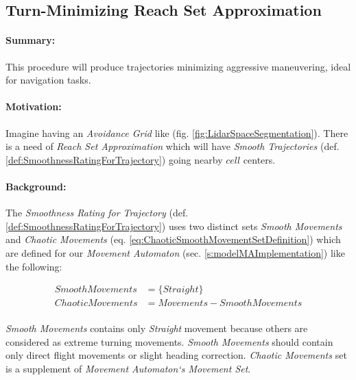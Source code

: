 \newpage
\subsection{Turn-Minimizing Reach Set Approximation}\label{s:harmonicReachSet}

\paragraph{Summary:} This procedure will produce trajectories minimizing aggressive maneuvering, ideal for navigation tasks.

\paragraph{Motivation:} Imagine having an \emph{Avoidance Grid} like (fig. \ref{fig:LidarSpaceSegmentation}). There is a need of \emph{Reach Set Approximation} which will have \emph{Smooth Trajectories} (def. \ref{def:SmoothnessRatingForTrajectory}) going nearby $cell$ centers.

\paragraph{Background:} The \emph{Smoothness Rating for Trajectory} (def. \ref{def:SmoothnessRatingForTrajectory}) uses two distinct sets \emph{Smooth Movements} and \emph{Chaotic Movements} (eq. \ref{eq:ChaoticSmoothMovementSetDefinition}) which are defined for our \emph{Movement Automaton}  (sec. \ref{s:modelMAImplementation}) like the following:

\begin{equation}
    \begin{aligned}
    Smooth Movements &= \{Straight\} \\
    Chaotic Movements &= Movements - Smooth Movements\\
    \end{aligned}
\end{equation}

\emph{Smooth Movements} contains only \emph{Straight} movement because others are considered as extreme turning movements. \emph{Smooth Movements} should contain only direct flight movements or slight heading correction. \emph{Chaotic Movements} set is a  supplement of \emph{Movement Automaton`s Movement Set}. 

